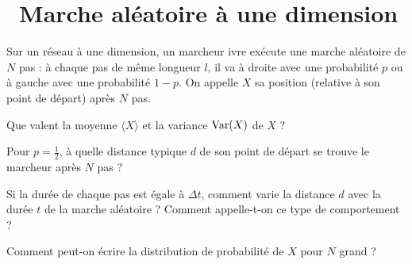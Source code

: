 \documentclass[utf8, 11pt]{feuille}
\begin{document}
\section{\medium~Marche aléatoire à une dimension}

Sur un réseau à une dimension, un marcheur ivre exécute une marche aléatoire de $N$ pas : à chaque pas de même longueur $l$, il va à droite avec une probabilité $p$ ou à gauche avec une probabilité $1-p$. On appelle $X$ sa position (relative à son point de départ) après $N$ pas.

\medskip

\question
Que valent la moyenne $\langle X \rangle$ et la variance ${\rm Var}(X)$ de $X$ ?

\question
Pour $p=\frac{1}{2}$, à quelle distance typique $d$ de son point de départ se trouve le marcheur après $N$ pas ? 

\question
Si la durée de chaque pas est égale à $\Delta t$, comment varie la distance $d$ avec la durée $t$ de la marche aléatoire ? Comment appelle-t-on ce type de comportement ?

\question
Comment peut-on écrire la distribution de probabilité de $X$ pour $N$ grand ?
\end{document}
